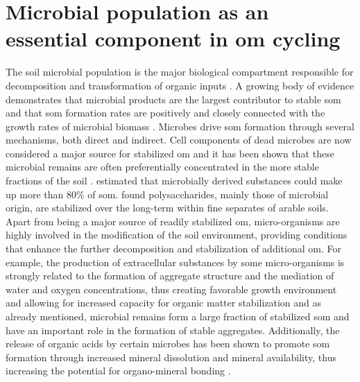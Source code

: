 \section{Microbial population as an essential component in \gls{om} cycling}

  	The soil microbial population is the major biological compartment responsible for decomposition and transformation of organic inputs \citep{thiet2006}. A growing body of evidence demonstrates that microbial products are the largest contributor to stable \gls{som} and that \gls{som} formation rates are positively and closely connected with the growth rates of microbial biomass \citep{kallenbach2016, kallenbach2015, ludwig2015, schurig2013, bradford2013}. Microbes drive \gls{som} formation through several mechanisms, both direct and indirect. Cell components of dead microbes are now considered a major source for stabilized \gls{om} \citep{kallenbach2015, liang2011, miltner2009} and it has been shown that these microbial remains are often preferentially concentrated in the more stable fractions of the soil \citep{ludwig2015}. \citet{liang2011} estimated that microbially derived substances could make up more than 80\% of \gls{som}⁠.
  	\citet{kiem2003} found polysaccharides, mainly those of microbial origin, are stabilized over the long-term within fine separates of arable soils.\\
  	Apart from being a major source of readily stabilized \gls{om}, micro-organisms are highly involved in the  modification of the soil environment, providing conditions that enhance the further decomposition and stabilization of additional \gls{om}.  For example, the production of extracellular substances by some micro-organisms is strongly related to the formation of aggregate structure and the mediation of water and oxygen concentrations, thus creating favorable growth environment and allowing for increased capacity for organic matter stabilization \citep{schimel2012} ⁠and as already mentioned, microbial remains form a large fraction of stabilized \gls{som} and have an important role in the formation of stable aggregates. Additionally, the release of organic acids by certain microbes has been shown to promote \gls{som} formation through increased mineral dissolution and mineral availability, thus increasing the potential for organo-mineral bonding \citep{yu2018}.



